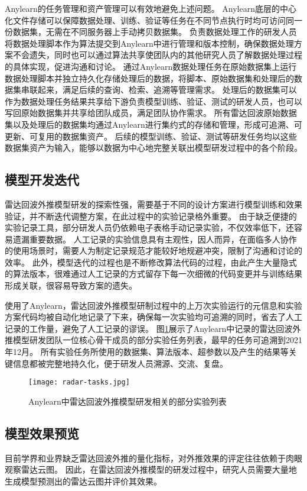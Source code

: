 Anylearn的任务管理和资产管理可以有效地避免上述问题。
Anylearn底层的中心化文件存储可以保障数据处理、训练、验证等任务在不同节点执行时均可访问同一份数据集，无需在不同服务器上手动拷贝数据集。
负责数据处理工作的研发人员将数据处理脚本作为算法提交到Anylearn中进行管理和版本控制，确保数据处理方案不会遗失，同时也可以通过算法共享使团队内的其他研究人员了解数据处理过程的具体实现，促进沟通和讨论。
通过Anylearn数据处理任务在原始数据集上运行数据处理脚本并独立持久化存储处理后的数据，将脚本、原始数据集和处理后的数据集串联起来，满足后续的查询、检索、追溯等管理需求。
处理后的数据集可以作为数据处理任务结果共享给下游负责模型训练、验证、测试的研发人员，也可以写回原始数据集并共享给团队成员，满足团队协作需求。
所有雷达回波原始数据集以及处理后的数据集均通过Anylearn进行集约式的存储和管理，形成可追溯、可更新、可复用的数据集资产。
后续的模型训练、验证、测试等研发任务均以这些数据集资产为输入，能够以数据为中心地完整关联出模型研发过程中的各个阶段。

\subsection{模型开发迭代}
雷达回波外推模型研发的探索性强，需要基于不同的设计方案进行模型训练和效果验证，并不断迭代调整方案，在此过程中的实验记录格外重要。
由于缺乏便捷的实验记录工具，部分研发人员仍依赖电子表格手动记录实验，不仅效率低下，还容易遗漏重要数据。
人工记录的实验信息具有主观性，因人而异，在面临多人协作的使用场景时，需要人为制定记录规范才能较好地规避冲突，限制了沟通和讨论的效率。
此外，模型迭代的过程也是不断修改算法代码的过程，由此产生大量隐式的算法版本，很难通过人工记录的方式留存下每一次细微的代码变更并与训练结果形成关联，很容易导致方案的遗失。

使用了Anylearn，雷达回波外推模型研制过程中的上万次实验运行的元信息和实验方案代码均被自动化地记录了下来，确保每一次实验均可追溯的同时，省去了人工记录的工作量，避免了人工记录的谬误。
图\ref{fig:radartasks}展示了Anylearn中记录的雷达回波外推模型研发团队一位核心骨干成员的部分实验任务列表，最早的任务可追溯到2021年12月。
所有实验任务所使用的数据集、算法版本、超参数以及产生的结果等关键信息都被完整地持久化，便于研发人员溯源、交流、复盘。

\begin{figure}
  \centering
  \texttt{[image: radar-tasks.jpg]}
  \caption{Anylearn中雷达回波外推模型研发相关的部分实验列表}
  \label{fig:radartasks}
\end{figure}

\subsection{模型效果预览}
目前学界和业界缺乏雷达回波外推的量化指标，对外推效果的评定往往依赖于肉眼观察雷达云图。
因此，在雷达回波外推模型的研发过程中，研究人员需要大量地生成模型预测出的雷达云图并评价其效果。

